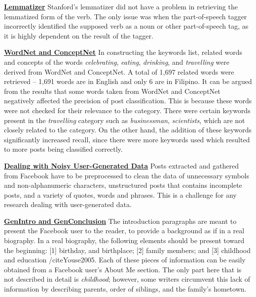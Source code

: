 \underline{\textbf{Lemmatizer}} \newline
Stanford's lemmatizer did not have a problem in retrieving the lemmatized form of the verb. The only issue was when the part-of-speech tagger incorrectly identified the supposed verb as a noun or other part-of-speech tag, as it is highly dependent on the result of the tagger.

\underline{\textbf{WordNet and ConceptNet}} \newline
In constructing the keywords list, related words and concepts of the words \textit{celebrating}, \textit{eating}, \textit{drinking}, and \textit{travelling} were derived from WordNet and ConceptNet. A total of 1,697 related words were retrieved -- 1,691 words are in English and only 6 are in Filipino. It can be argued from the results that some words taken from WordNet and ConceptNet negatively affected the precision of post classification. This is because these words were not checked for their relevance to the category. There were certain keywords present in the \textit{travelling} category such as \textit{businessman}, \textit{scientists}, which are not closely related to the category. On the other hand, the addition of these keywords significantly increased recall, since there were more keywords used which resulted to more posts being classified correctly.

\underline{\textbf{Dealing with Noisy User-Generated Data}} \newline
Posts extracted and gathered from Facebook have to be preprocessed to clean the data of unnecessary symbols and non-alphanumeric characters, unstructured posts that contains incomplete posts, and a variety of quotes, words and phrases. This is a challenge for any research dealing with user-generated data.

\underline{\textbf{GenIntro and GenConclusion}} \newline
The introduction paragraphs are meant to present the Facebook user to the reader, to provide a background as if in a real biography. In a real biography, the following elements should be present toward the beginning: [1] birthday, and birthplace; [2] family members; and [3] childhood and education /cite{Youse2005}. Each of these pieces of information can be easily obtained from a Facebook user's About Me section. The only part here that is not described in detail is \textit{childhood}; however, some writers circumvent this lack of information by describing parents, order of siblings, and the family's hometown.

